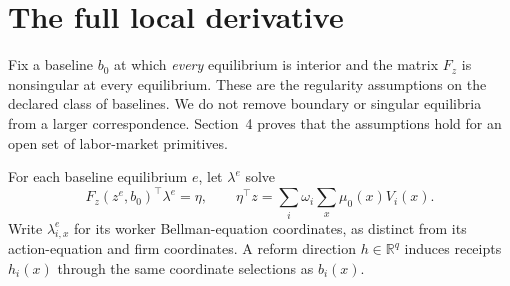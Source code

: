 \documentclass[11pt]{article}
\newcommand{\R}{\mathbb R}
\begin{document}
\section{The full local derivative}
Fix a baseline $b_0$ at which \emph{every} equilibrium is interior and the matrix $F_z$ is nonsingular at every equilibrium. These are the regularity assumptions on the declared class of baselines. We do not remove boundary or singular equilibria from a larger correspondence. Section~4 proves that the assumptions hold for an open set of labor-market primitives.

For each baseline equilibrium $e$, let $\lambda^e$ solve
\begin{equation}\label{eq:adjoint}
 F_z(z^e,b_0)^\top\lambda^e=\eta,\qquad
 \eta^\top z=\sum_i\omega_i\sum_x\mu_0(x)V_i(x).
\end{equation}
Write $\lambda^e_{i,x}$ for its worker Bellman-equation coordinates, as distinct from its action-equation and firm coordinates. A reform direction $h\in\R^q$ induces receipts $h_i(x)$ through the same coordinate selections as $b_i(x)$.
\end{document}

